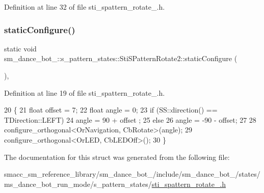 Definition at line 32 of file sti\+\_\+spattern\+\_\+rotate\+\_.\+h.


\mbox{\label{structsm__dance__bot__2_1_1s__pattern__states_1_1StiSPatternRotate2_a8b98c9995c69c8ab14c9cca329deed9e}} 
\subsubsection{\texorpdfstring{static\+Configure()}{staticConfigure()}}
{\footnotesize\ttfamily static void sm\+\_\+dance\+\_\+bot\+\_\+::s\+\_\+pattern\+\_\+states\+::\+Sti\+S\+Pattern\+Rotate2\+::static\+Configure (\begin{DoxyParamCaption}{ }\end{DoxyParamCaption})\hspace{0.3cm}{\ttfamily [inline]}, {\ttfamily [static]}}



Definition at line 19 of file sti\+\_\+spattern\+\_\+rotate\+\_.\+h.


\begin{DoxyCode}
20     \{
21         \textcolor{keywordtype}{float} offset = 7;
22         \textcolor{keywordtype}{float} angle = 0;
23         \textcolor{keywordflow}{if} (SS::direction() == TDirection::LEFT)
24             angle = 90 + offset ;
25         \textcolor{keywordflow}{else}
26             angle = -90 - offset;
27 
28         configure\_orthogonal<OrNavigation, CbRotate>(angle);
29         configure\_orthogonal<OrLED, CbLEDOff>();
30     \}
\end{DoxyCode}


The documentation for this struct was generated from the following file\+:\begin{DoxyCompactItemize}
\item 
smacc\+\_\+sm\+\_\+reference\+\_\+library/sm\+\_\+dance\+\_\+bot\+\_/include/sm\+\_\+dance\+\_\+bot\+\_/states/ms\+\_\+dance\+\_\+bot\+\_\+run\+\_\+mode/s\+\_\+pattern\+\_\+states/\hyperlink{2_2include_2sm__dance__bot__2_2states_2ms__dance__bot__run__mode_2s__pattern__states_2sti__spattern__rotate__2_8h}{sti\+\_\+spattern\+\_\+rotate\+\_.\+h}\end{DoxyCompactItemize}
